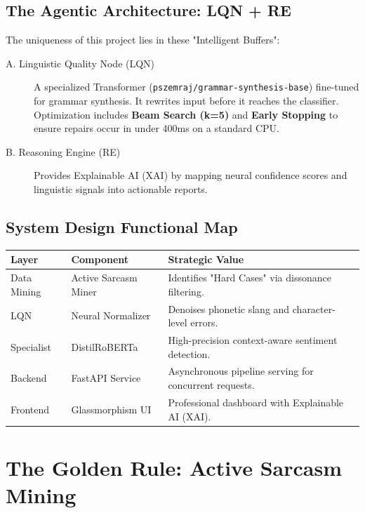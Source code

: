 \documentclass[11pt,oneside]{scrbook}
\begin{document}
\section{The Agentic Architecture: LQN + RE}
The uniqueness of this project lies in these "Intelligent Buffers":
\begin{description}
    \item[A. Linguistic Quality Node (LQN)] A specialized Transformer (\texttt{pszemraj/grammar-synthesis-base}) fine-tuned for grammar synthesis. It rewrites input before it reaches the classifier. Optimization includes \textbf{Beam Search (k=5)} and \textbf{Early Stopping} to ensure repairs occur in under 400ms on a standard CPU.
    \item[B. Reasoning Engine (RE)] Provides Explainable AI (XAI) by mapping neural confidence scores and linguistic signals into actionable reports.
\end{description}

\section{System Design Functional Map}
\begin{longtable}{p{2.5cm}p{3.5cm}p{7.5cm}}
\toprule
\textbf{Layer} & \textbf{Component} & \textbf{Strategic Value} \\
\midrule
Data Mining & Active Sarcasm Miner & Identifies "Hard Cases" via dissonance filtering. \\
LQN & Neural Normalizer & Denoises phonetic slang and character-level errors. \\
Specialist & DistilRoBERTa & High-precision context-aware sentiment detection. \\
Backend & FastAPI Service & Asynchronous pipeline serving for concurrent requests. \\
Frontend & Glassmorphism UI & Professional dashboard with Explainable AI (XAI). \\
\bottomrule
\end{longtable}

\chapter{The Golden Rule: Active Sarcasm Mining}
\end{document}
